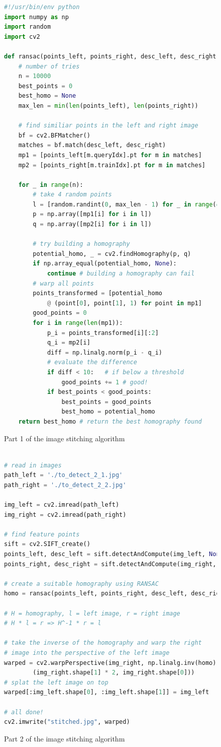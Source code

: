 \documentclass[a4paper, titlepage,12pt]{article}
\begin{document}
	\begin{figure}[H]
		\begin{lstlisting}[language=Python]
#!/usr/bin/env python
import numpy as np
import random
import cv2

def ransac(points_left, points_right, desc_left, desc_right):
	# number of tries
    n = 10000
    best_points = 0
    best_homo = None
    max_len = min(len(points_left), len(points_right))

	# find similiar points in the left and right image
    bf = cv2.BFMatcher()
    matches = bf.match(desc_left, desc_right)
    mp1 = [points_left[m.queryIdx].pt for m in matches]
    mp2 = [points_right[m.trainIdx].pt for m in matches]

    for _ in range(n):
		# take 4 random points
        l = [random.randint(0, max_len - 1) for _ in range(4)]
        p = np.array([mp1[i] for i in l])
        q = np.array([mp2[i] for i in l])

		# try building a homography
        potential_homo, _ = cv2.findHomography(p, q)
        if np.array_equal(potential_homo, None):
            continue # building a homography can fail
		# warp all points
        points_transformed = [potential_homo 
			@ (point[0], point[1], 1) for point in mp1]
        good_points = 0
        for i in range(len(mp1)):
            p_i = points_transformed[i][:2]
            q_i = mp2[i]
            diff = np.linalg.norm(p_i - q_i)
			# evaluate the difference
            if diff < 10:	# if below a threshold
                good_points += 1 # good!
            if best_points < good_points:
                best_points = good_points
                best_homo = potential_homo
    return best_homo # return the best homography found
		\end{lstlisting}
		\caption{Part 1 of the image stitching algorithm}
	\end{figure}
	\begin{figure}[H]
		\begin{lstlisting}[language=Python]

# read in images
path_left = './to_detect_2_1.jpg'
path_right = './to_detect_2_2.jpg'

img_left = cv2.imread(path_left)
img_right = cv2.imread(path_right)

# find feature points
sift = cv2.SIFT_create()
points_left, desc_left = sift.detectAndCompute(img_left, None)
points_right, desc_right = sift.detectAndCompute(img_right, None)

# create a suitable homography using RANSAC
homo = ransac(points_left, points_right, desc_left, desc_right)

# H = homography, l = left image, r = right image
# H * l = r => H^-1 * r = l

# take the inverse of the homography and warp the right
# image into the perspective of the left image
warped = cv2.warpPerspective(img_right, np.linalg.inv(homo), 
		(img_right.shape[1] * 2, img_right.shape[0]))
# splat the left image on top
warped[:img_left.shape[0], :img_left.shape[1]] = img_left

# all done!
cv2.imwrite("stitched.jpg", warped)
		\end{lstlisting}
		\caption{Part 2 of the image stitching algorithm}
	\end{figure}
	\newpage
	\printbibliography
\end{document}
